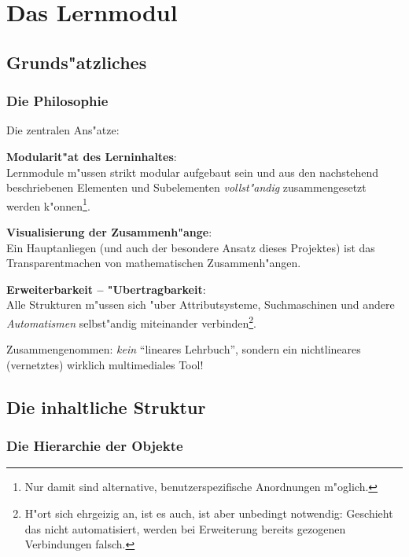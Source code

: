 
\section{Das Lernmodul}\label{lernmodul}


\subsection{Grunds"atzliches}

\subsubsection{Die Philosophie}

Die zentralen Ans"atze:

\begin{list_sabina}
        \item 
	\textbf{Modularit"at des Lerninhaltes}:\\ 
	Lernmodule m"ussen strikt modular aufgebaut sein und aus den nachstehend
	beschriebenen Elementen und Subelementen \textit{vollst"andig} 
	zusammengesetzt werden k"onnen\footnote{Nur damit sind alternative, 
	benutzerspezifische Anordnungen m"oglich.}. 
        \item 
	\textbf{Visualisierung der Zusammenh"ange}:\\
	Ein Hauptanliegen (und auch der besondere Ansatz dieses Projektes) ist
	das Transparentmachen von mathematischen Zusammenh"angen.
        \item 
	\textbf{Erweiterbarkeit -- "Ubertragbarkeit}:\\ 
	Alle Strukturen m"ussen sich "uber Attributsysteme, Suchmaschinen
	und andere \textit{Automatismen} selbst"andig miteinander 
	verbinden\footnote{H"ort sich ehrgeizig an, ist es auch, ist aber unbedingt
	notwendig: Geschieht das nicht automatisiert, werden bei Erweiterung 
	bereits gezogenen Verbindungen falsch.}.
\end{list_sabina}

Zusammengenommen: \textit{kein} ``lineares Lehrbuch'', sondern ein
nichtlineares (vernetztes) wirklich multimediales Tool!



\subsection{Die inhaltliche Struktur}\label{inhaltliche_struktur_lernmodul}

\subsubsection{Die Hierarchie der Objekte}

